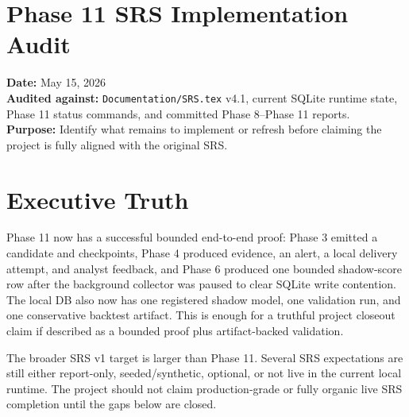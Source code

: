 \documentclass{article}
\begin{document}
\section*{Phase 11 SRS Implementation Audit}

\textbf{Date:} May 15, 2026\\
\textbf{Audited against:} \texttt{Documentation/SRS.tex} v4.1, current SQLite runtime state, Phase 11 status commands, and committed Phase 8--Phase 11 reports.\\
\textbf{Purpose:} Identify what remains to implement or refresh before claiming the project is fully aligned with the original SRS.

\section*{Executive Truth}
Phase 11 now has a successful bounded end-to-end proof: Phase 3 emitted a candidate and checkpoints, Phase 4 produced evidence, an alert, a local delivery attempt, and analyst feedback, and Phase 6 produced one bounded shadow-score row after the background collector was paused to clear SQLite write contention. The local DB also now has one registered shadow model, one validation run, and one conservative backtest artifact. This is enough for a truthful project closeout claim if described as a bounded proof plus artifact-backed validation.

The broader SRS v1 target is larger than Phase 11. Several SRS expectations are still either report-only, seeded/synthetic, optional, or not live in the current local runtime. The project should not claim production-grade or fully organic live SRS completion until the gaps below are closed.
\end{document}
